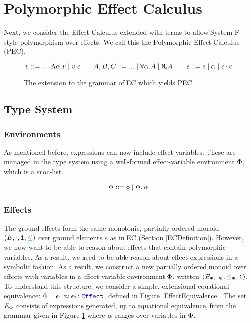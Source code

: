 \documentclass{Report}
\begin{document}
\section{Polymorphic Effect Calculus}


Next, we consider the Effect Calculus extended with terms to allow System-F-style polymorphism over effects. We call this the Polymorphic Effect Calculus (PEC).

\begin{figure}[H]
    \centering
    \begin{framed}
        
\[
    v::=\text{..}\mid\elam{\a}{v}\mid\eapp{v}{\e}
    \quad\quad
    A, B, C::=\text{...}\mid \all{\a}{A}\mid\mea
    \quad\quad
    \e ::= e \mid \a \mid \e\dot\e
\]
    \end{framed}
    \caption{The extension to the grammar of EC which yields PEC}
    \label{PECExtension}
\end{figure}

\subsection{Type System}
\label{PECTypeSystem}
\subsubsection{Environments}
As mentioned before, expressions can now include effect variables. These are managed in the type system using a well-formed effect-variable environment $\P$, which is a snoc-list.

\begin{align*}
    \P ::= \nil \mid \P, \a
\end{align*}



\subsubsection{Effects}
The ground effects form the same monotonic, partially ordered monoid $(E, \dot, \1, \subeffect)$ over ground elements $e$ as in EC (Section \ref{ECDefinition}). However, we now want to be able to reason about effects that contain polymorphic variables. As a  result, we need to be able reason about effect expressions in a symbolic fashion. As a result, we construct a new partially ordered monoid over effects with variables in a effect-variable environment $\P$, written $(E_\P, \dotp, \subeffectp, \1)$. To understand this structure, we consider a simple, extensional equational equivalence: $\zpberelation{\e_1}{\e_2}{\effect}$, defined in Figure \ref{EffectEquivalence}. The set $E_\P$ consists of expressions generated, up to equational equivalence, from the grammar given in Figure \ref{PECExtension} where $\a$ ranges over variables in $\P$.
\end{document}
